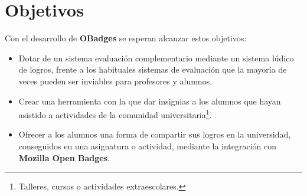 \section{Objetivos}
	Con el desarrollo de \textbf{OBadges} se esperan alcanzar estos objetivos:
	\begin{itemize}
		\item Dotar de un sistema evaluación complementario mediante un sistema lúdico de logros, frente a los habituales sistemas de evaluación que la mayoría de veces pueden ser inviables para profesores y alumnos.
		\item Crear una herramienta con la que dar insignias a los alumnos que hayan asistido a actividades de la comunidad universitaria\footnote{Talleres, cursos o actividades extraescolares.}.
		\item Ofrecer a los alumnos una forma de compartir sus logros en la universidad, conseguidos en una asignatura o actividad, mediante la integración con \textbf{Mozilla Open Badges}.
	\end{itemize}
